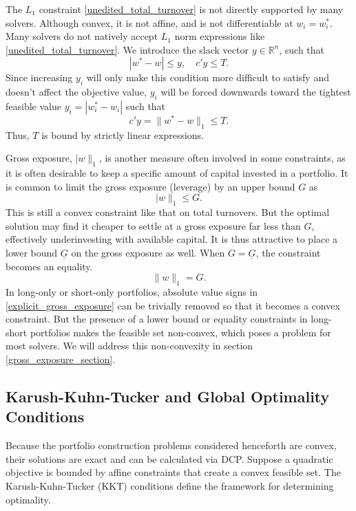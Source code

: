 \documentclass[11pt, letterpaper]{article}
\begin{document}
The $L_1$ constraint \eqref{unedited_total_turnover} is not directly supported by many solvers. Although convex, it is not
affine, and is not differentiable at $w_i = w_i^*$. Many solvers do not natively accept $L_1$ norm expressions like
\eqref{unedited_total_turnover}. We introduce the slack vector $y \in \mathds{R}^n$, such that
\begin{equation}\label{eq:tvr-slack}
	|w^* - w| \leq y, \quad c'y \leq T.
\end{equation}
Since increasing $y_i$ will only make this condition more difficult to satisfy and doesn't affect the objective value, $y_i$
will be forced downwards toward the tightest feasible value $y_i = |w_i^* - w_i|$ such that
\begin{equation*}
    c' y = \lVert w^* - w\rVert_1 \leq T.
\end{equation*}
Thus, $T$ is bound by strictly linear expressions.

Gross exposure, $\lvert w\rVert_1$, is another measure often involved in some constraints, as it is often desirable to keep a
specific amount of capital invested in a portfolio. It is common to limit the gross exposure (leverage) by an upper bound $G$ as
\begin{equation}\label{eq:exposure-ineq}
	\lvert w\rVert_1 \leq G.
\end{equation}
This is still a convex constraint like that on total turnovers. But the optimal solution may find it cheaper to settle at a
gross exposure far less than $G$, effectively underinvesting with available capital. It is thus attractive to place a lower
bound $\underline{G}$ on the gross exposure as well. When $G=\underline{G}$, the constraint becomes an equality.
\begin{equation}
    \label{explicit_gross_exposure}
	\lVert w\rVert_1 = G.
\end{equation}
In long-only or short-only portfolios, absolute value signs in \eqref{explicit_gross_exposure} can be trivially removed so that
it becomes a convex constraint. But the presence of a lower bound or equality constraints in long-short portfolios makes the
feasible set non-convex, which poses a problem for most solvers. We will address this non-convexity in section
\ref{gross_exposure_section}.

\subsection{Karush-Kuhn-Tucker and Global Optimality Conditions}
\label{KKT_section}
Because the portfolio construction problems considered henceforth are convex, their solutions are
exact and can be calculated via DCP. Suppose a quadratic objective is bounded by affine constraints that
create a convex feasible set. The Karush-Kuhn-Tucker (KKT) conditions \cite{boyd2004KKT} define the framework for determining
optimality.
\end{document}
